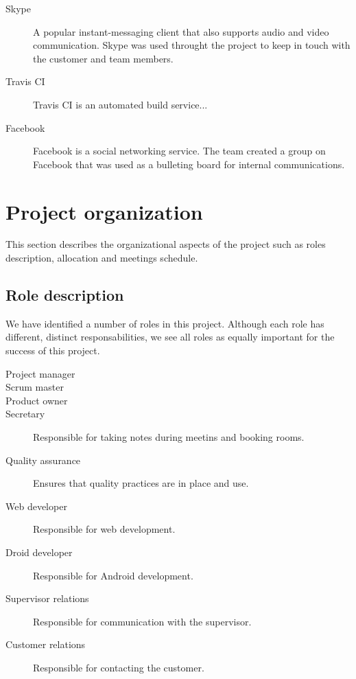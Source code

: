 \begin{description}
\item[Skype]
A popular instant-messaging client that also supports audio and video communication.
Skype was used throught the project to keep in touch with the customer and team members.

\item[Travis CI]
Travis CI is an automated build service...

\item[Facebook]
Facebook is a social networking service. The team created a group on Facebook that was used as a bulleting board for internal communications.


\end{description}


\section{Project organization}
\label{section:organization}
This section describes the organizational aspects of the project such as roles description, allocation and meetings schedule.

\subsection{Role description}
We have identified a number of roles in this project. Although each role has different, distinct responsabilities, we see all roles as equally important for the success of this project.

\begin{description}
\item[Project manager]
\item[Scrum master]
\item[Product owner]
\item[Secretary]
Responsible for taking notes during meetins and booking rooms.
\item[Quality assurance]
Ensures that quality practices are in place and use.
\item[Web developer]
Responsible for web development.
\item[Droid developer]
Responsible for Android development.
\item[Supervisor relations]
Responsible for communication with the supervisor.
\item[Customer relations]
Responsible for contacting the customer.
\end{description}


